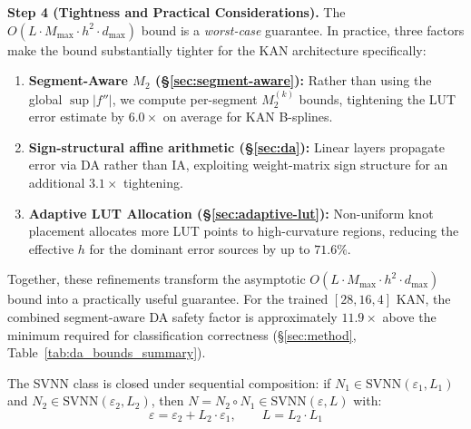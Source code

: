 \vspace{2pt}
\noindent\textbf{Step 4 (Tightness and Practical Considerations).}
The $O(L \cdot M_{\max} \cdot h^2 \cdot d_{\max})$ bound is a \textit{worst-case}
guarantee. In practice, three factors make the bound substantially
tighter for the KAN architecture specifically:
\begin{enumerate}
    \item \textbf{Segment-Aware $M_2$ ({\S}\ref{sec:segment-aware}):}
          Rather than using the global $\sup |f''|$, we compute
          per-segment $M_2^{(k)}$ bounds, tightening the LUT error
          estimate by $6.0\times$ on average for KAN B-splines.
    \item \textbf{Sign-structural affine arithmetic ({\S}\ref{sec:da}):}
          Linear layers propagate error via DA rather than IA,
          exploiting weight-matrix sign structure for an additional
          $3.1\times$ tightening.
    \item \textbf{Adaptive LUT Allocation ({\S}\ref{sec:adaptive-lut}):}
          Non-uniform knot placement allocates more LUT points to
          high-curvature regions, reducing the effective $h$ for
          the dominant error sources by up to $71.6\%$.
\end{enumerate}
Together, these refinements transform the asymptotic $O(L \cdot M_{\max}
\cdot h^2 \cdot d_{\max})$ bound into a practically useful guarantee. For the trained
$[28,16,4]$ KAN, the combined segment-aware DA safety factor is approximately
$11.9\times$ above the minimum required for classification correctness
({\S}\ref{sec:method}, Table~\ref{tab:da_bounds_summary}).

\setcounter{theorem}{7}
\begin{theorem}
\label{thm:svnn-closure}
The SVNN class is closed under sequential composition: if
$N_1 \in \text{SVNN}(\varepsilon_1, L_1)$ and
$N_2 \in \text{SVNN}(\varepsilon_2, L_2)$, then
$N = N_2 \circ N_1 \in \text{SVNN}(\varepsilon, L)$ with:
\begin{equation}
\varepsilon = \varepsilon_2 + L_2 \cdot \varepsilon_1,\qquad
L = L_2 \cdot L_1 \label{eq:svnn_closure}
\end{equation}
\end{theorem}

